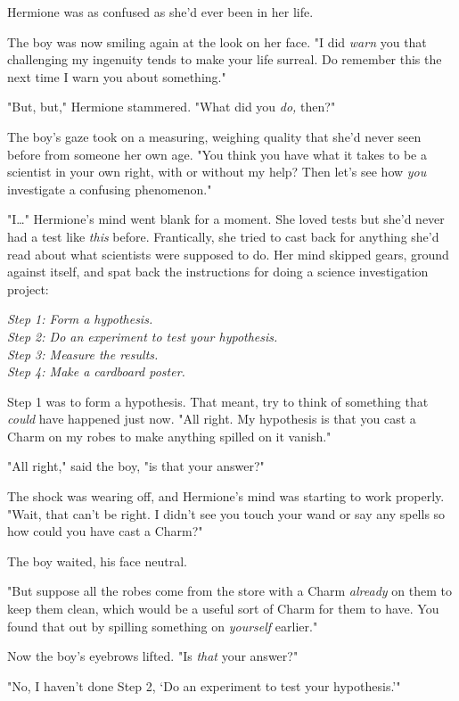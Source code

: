 Hermione was as confused as she'd ever been in her life.

The boy was now smiling again at the look on her face. "I did \emph{warn} you 
that challenging my ingenuity tends to make your life surreal. Do remember this 
the next time I warn you about something."

"But, but," Hermione stammered. "What did you \emph{do,} then?"

The boy's gaze took on a measuring, weighing quality that she'd never seen 
before from someone her own age. "You think you have what it takes to be a 
scientist in your own right, with or without my help? Then let's see how 
\emph{you} investigate a confusing phenomenon."

"I{\ldots}" Hermione's mind went blank for a moment. She loved tests but she'd 
never had a test like \emph{this} before. Frantically, she tried to cast back 
for anything she'd read about what scientists were supposed to do. Her mind 
skipped gears, ground against itself, and spat back the instructions for doing 
a science investigation project:

\emph{Step 1: Form a hypothesis.\\
Step 2: Do an experiment to test your hypothesis.\\
Step 3: Measure the results.\\
Step 4: Make a cardboard poster.}

Step 1 was to form a hypothesis. That meant, try to think of something that 
\emph{could} have happened just now. "All right. My hypothesis is that you cast 
a Charm on my robes to make anything spilled on it vanish."

"All right," said the boy, "is that your answer?"

The shock was wearing off, and Hermione's mind was starting to work properly. 
"Wait, that can't be right. I didn't see you touch your wand or say any spells 
so how could you have cast a Charm?"

The boy waited, his face neutral.

"But suppose all the robes come from the store with a Charm \emph{already} on 
them to keep them clean, which would be a useful sort of Charm for them to 
have. You found that out by spilling something on \emph{yourself} earlier."

Now the boy's eyebrows lifted. "Is \emph{that} your answer?"

"No, I haven't done Step 2, `Do an experiment to test your hypothesis.'"

